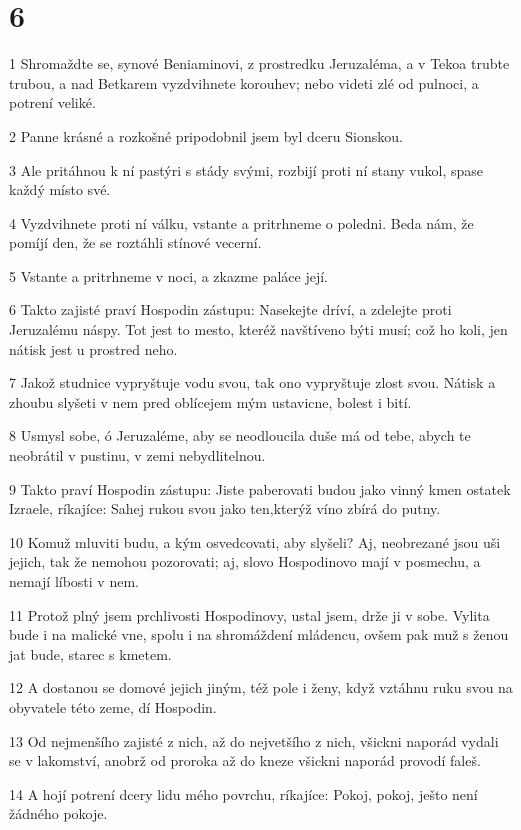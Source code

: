 \chapter{6}

\par 1 Shromaždte se, synové Beniaminovi, z prostredku Jeruzaléma, a v Tekoa trubte trubou, a nad Betkarem vyzdvihnete korouhev; nebo videti zlé od pulnoci, a potrení veliké.
\par 2 Panne krásné a rozkošné pripodobnil jsem byl dceru Sionskou.
\par 3 Ale pritáhnou k ní pastýri s stády svými, rozbijí proti ní stany vukol, spase každý místo své.
\par 4 Vyzdvihnete proti ní válku, vstante a pritrhneme o poledni. Beda nám, že pomíjí den, že se roztáhli stínové vecerní.
\par 5 Vstante a pritrhneme v noci, a zkazme paláce její.
\par 6 Takto zajisté praví Hospodin zástupu: Nasekejte dríví, a zdelejte proti Jeruzalému náspy. Tot jest to mesto, kteréž navštíveno býti musí; což ho koli, jen nátisk jest u prostred neho.
\par 7 Jakož studnice vypryštuje vodu svou, tak ono vypryštuje zlost svou. Nátisk a zhoubu slyšeti v nem pred oblícejem mým ustavicne, bolest i bití.
\par 8 Usmysl sobe, ó Jeruzaléme, aby se neodloucila duše má od tebe, abych te neobrátil v pustinu, v zemi nebydlitelnou.
\par 9 Takto praví Hospodin zástupu: Jiste paberovati budou jako vinný kmen ostatek Izraele, ríkajíce: Sahej rukou svou jako ten,kterýž víno zbírá do putny.
\par 10 Komuž mluviti budu, a kým osvedcovati, aby slyšeli? Aj, neobrezané jsou uši jejich, tak že nemohou pozorovati; aj, slovo Hospodinovo mají v posmechu, a nemají líbosti v nem.
\par 11 Protož plný jsem prchlivosti Hospodinovy, ustal jsem, drže ji v sobe. Vylita bude i na malické vne, spolu i na shromáždení mládencu, ovšem pak muž s ženou jat bude, starec s kmetem.
\par 12 A dostanou se domové jejich jiným, též pole i ženy, když vztáhnu ruku svou na obyvatele této zeme, dí Hospodin.
\par 13 Od nejmenšího zajisté z nich, až do nejvetšího z nich, všickni naporád vydali se v lakomství, anobrž od proroka až do kneze všickni naporád provodí faleš.
\par 14 A hojí potrení dcery lidu mého povrchu, ríkajíce: Pokoj, pokoj, ješto není žádného pokoje.
